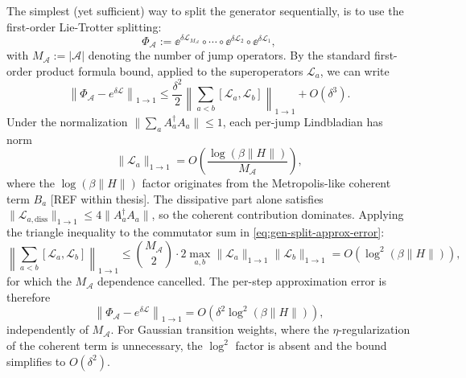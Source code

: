 The simplest (yet sufficient) way to split the generator sequentially, is to use the first-order Lie-Trotter splitting:
\begin{equation}
    \Phi_{\mathcal{A}} := \ee^{\delta \mathcal{L}_{M_\mathcal{A}}} \circ \cdots \circ \ee^{\delta \mathcal{L}_2} \circ \ee^{\delta \mathcal{L}_1},
\end{equation}
with $M_\mathcal{A} := |\mathcal{A}|$ denoting the number of jump operators. By the standard first-order product formula bound, applied to the superoperators $\mathcal{L}_a$, we can write  
\begin{equation} \label{eq:gen-split-approx-error}
    \left\|\Phi_{\mathcal{A}} - e^{\delta \mathcal{L}}\right\|_{1\to 1} \leq \frac{\delta^2}{2} \left\|\sum_{a < b} [\mathcal{L}_a, \mathcal{L}_b]\right\|_{1\to 1} + O(\delta^3).
\end{equation}
Under the normalization $\|\sum_a A_a^\dagger A_a\| \leq 1$, each per-jump Lindbladian has norm
\begin{equation}
    \|\mathcal{L}_a\|_{1 \to 1} = O\!\left(\frac{\log(\beta\|H\|)}{M_\mathcal{A}}\right),
\end{equation}
where the $\log(\beta\|H\|)$ factor originates from the Metropolis-like coherent term $B_a$ [REF within thesis]. The dissipative part alone satisfies $\|\mathcal{L}_{a,\mathrm{diss}}\|_{1\to 1} \leq 4\|A_a^\dagger A_a\|$, so the coherent contribution dominates. Applying the triangle inequality to the commutator sum in \eqref{eq:gen-split-approx-error}:
\begin{equation}
    \left\|\sum_{a<b} [\mathcal{L}_a, \mathcal{L}_b]\right\|_{1\to 1} 
    \leq \binom{M_\mathcal{A}}{2} \cdot 2 \max_{a,b} \|\mathcal{L}_a\|_{1\to 1}\|\mathcal{L}_b\|_{1\to 1} 
    = O\!\left(\log^2(\beta\|H\|)\right),
\end{equation}
for which the $M_\mathcal{A}$ dependence cancelled. The per-step approximation error is therefore
\begin{equation} \label{eq:gen-split-explicit-bound}
    \left\|\Phi_{\mathcal{A}} - e^{\delta \mathcal{L}}\right\|_{1\to 1} = O\!\left(\delta^2 \log^2(\beta\|H\|)\right),
\end{equation}
independently of $M_\mathcal{A}$. For Gaussian transition weights, where the $\eta$-regularization of the coherent term is unnecessary, the $\log^2$ factor is absent and the bound simplifies to $O(\delta^2)$.

